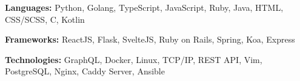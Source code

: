 \textbf{Languages:} Python,  Golang, TypeScript, JavaScript, Ruby, Java, HTML, CSS\slash SCSS, C, Kotlin

\vspace{0.2cm}

\textbf{Frameworks:} ReactJS, Flask, SvelteJS, Ruby on Rails, Spring, Koa, Express

\vspace{0.2cm}

\textbf{Technologies:} GraphQL, Docker, Linux, TCP/IP, REST API, Vim, PostgreSQL, Nginx, Caddy Server, Ansible
